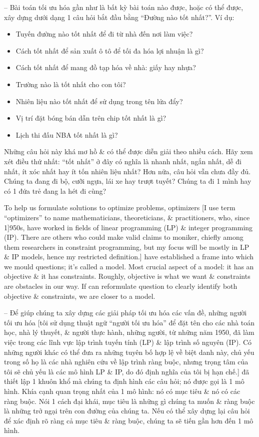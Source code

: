 \documentclass{article}
\begin{document}
\begin{itemize}
\begin{itemize}
        -- Bài toán tối ưu hóa gần như là bất kỳ bài toán nào được, hoặc có thể được, xây dựng dưới dạng 1 câu hỏi bắt đầu bằng ``Đường nào tốt nhất?''. Ví dụ:
        \begin{itemize}
            \item Tuyến đường nào tốt nhất để đi từ nhà đến nơi làm việc?
            \item Cách tốt nhất để sản xuất ô tô để tối đa hóa lợi nhuận là gì?
            \item Cách tốt nhất để mang đồ tạp hóa về nhà: giấy hay nhựa?
            \item Trường nào là tốt nhất cho con tôi?
            \item Nhiên liệu nào tốt nhất để sử dụng trong tên lửa đẩy?
            \item Vị trí đặt bóng bán dẫn trên chip tốt nhất là gì?
            \item Lịch thi đấu NBA tốt nhất là gì?
        \end{itemize}
        Những câu hỏi này khá mơ hồ \& có thể được diễn giải theo nhiều cách. Hãy xem xét điều thứ nhất: ``tốt nhất'' ở đây có nghĩa là nhanh nhất, ngắn nhất, dễ đi nhất, ít xóc nhất hay ít tốn nhiên liệu nhất? Hơn nữa, câu hỏi vẫn chưa đầy đủ. Chúng ta đang đi bộ, cưỡi ngựa, lái xe hay trượt tuyết? Chúng ta đi 1 mình hay có 1 đứa trẻ đang la hét đi cùng?

        To help us formulate solutions to optimize problems, optimizers [I use term ``optimizers'' to name mathematicians, theoreticians, \& practitioners, who, since 1]950s, have worked in fields of linear programming (LP) \& integer programming (IP). There are others who could make valid claims to moniker, chiefly among them researchers in constraint programming, but my focus will be mostly in LP \& IP models, hence my restricted definition.] have established a frame into which we mould questions; it's called a model. Most crucial aspect of a model: it has an objective \& it has constraints. Roughly, objective is what we want \& constraints are obstacles in our way. If can reformulate question to clearly identify both objective \& constraints, we are closer to a model.

        -- Để giúp chúng ta xây dựng các giải pháp tối ưu hóa các vấn đề, những người tối ưu hóa [tôi sử dụng thuật ngữ ``người tối ưu hóa'' để đặt tên cho các nhà toán học, nhà lý thuyết, \& người thực hành, những người, từ những năm 1950, đã làm việc trong các lĩnh vực lập trình tuyến tính (LP) \& lập trình số nguyên (IP). Có những người khác có thể đưa ra những tuyên bố hợp lệ về biệt danh này, chủ yếu trong số họ là các nhà nghiên cứu về lập trình ràng buộc, nhưng trọng tâm của tôi sẽ chủ yếu là các mô hình LP \& IP, do đó định nghĩa của tôi bị hạn chế.] đã thiết lập 1 khuôn khổ mà chúng ta định hình các câu hỏi; nó được gọi là 1 mô hình. Khía cạnh quan trọng nhất của 1 mô hình: nó có mục tiêu \& nó có các ràng buộc. Nói 1 cách đại khái, mục tiêu là những gì chúng ta muốn \& ràng buộc là những trở ngại trên con đường của chúng ta. Nếu có thể xây dựng lại câu hỏi để xác định rõ ràng cả mục tiêu \& ràng buộc, chúng ta sẽ tiến gần hơn đến 1 mô hình.


\end{itemize}
\end{itemize}
\end{document}
